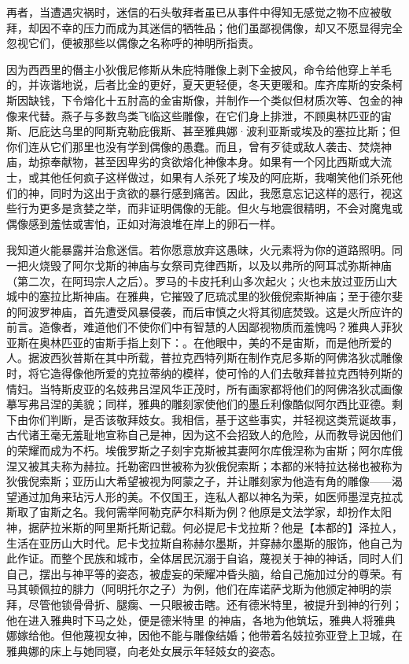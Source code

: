 再者，当遭遇灾祸时，迷信的石头敬拜者虽已从事件中得知无感觉之物不应被敬拜，却因不幸的压力而成为其迷信的牺牲品；他们虽鄙视偶像，却又不愿显得完全忽视它们，便被那些以偶像之名称呼的神明所指责。\par

因为西西里的僭主小狄俄尼修斯从朱庇特雕像上剥下金披风，命令给他穿上羊毛的，并诙谐地说，后者比金的更好，夏天更轻便，冬天更暖和。库齐库斯的安条柯斯因缺钱，下令熔化十五肘高的金宙斯像，并制作一个类似但材质次等、包金的神像来代替。燕子与多数鸟类飞临这些雕像，在它们身上排泄，不顾奥林匹亚的宙斯、厄庇达乌里的阿斯克勒庇俄斯、甚至雅典娜·波利亚斯或埃及的塞拉比斯；但你们连从它们那里也没有学到偶像的愚蠢。而且，曾有歹徒或敌人袭击、焚烧神庙，劫掠奉献物，甚至因卑劣的贪欲熔化神像本身。如果有一个冈比西斯或大流士，或其他任何疯子这样做过，如果有人杀死了埃及的阿庇斯，我嘲笑他们杀死他们的神，同时为这出于贪欲的暴行感到痛苦。因此，我愿意忘记这样的恶行，视这些行为更多是贪婪之举，而非证明偶像的无能。但火与地震很精明，不会对魔鬼或偶像感到羞怯或害怕，正如对海浪堆在岸上的卵石一样。\par

我知道火能暴露并治愈迷信。若你愿意放弃这愚昧，火元素将为你的道路照明。同一把火烧毁了阿尔戈斯的神庙与女祭司克律西斯，以及以弗所的阿耳忒弥斯神庙（第二次，在阿玛宗人之后）。罗马的卡皮托利山多次起火；火也未放过亚历山大城中的塞拉比斯神庙。在雅典，它摧毁了厄琉忒里的狄俄倪索斯神庙；至于德尔斐的阿波罗神庙，首先遭受风暴侵袭，而后审慎之火将其彻底焚毁。这是火所应许的前言。造像者，难道他们不使你们中有智慧的人因鄙视物质而羞愧吗？雅典人菲狄亚斯在奥林匹亚的宙斯手指上刻下：。在他眼中，美的不是宙斯，而是他所爱的人。据波西狄普斯在其中所载，普拉克西特列斯在制作克尼多斯的阿佛洛狄忒雕像时，将它造得像他所爱的克拉蒂纳的模样，使可怜的人们去敬拜普拉克西特列斯的情妇。当特斯皮亚的名妓弗吕涅风华正茂时，所有画家都将他们的阿佛洛狄忒画像摹写弗吕涅的美貌；同样，雅典的雕刻家使他们的墨丘利像酷似阿尔西比亚德。剩下由你们判断，是否该敬拜妓女。我相信，基于这些事实，并轻视这类荒诞故事，古代诸王毫无羞耻地宣称自己是神，因为这不会招致人的危险，从而教导说因他们的荣耀而成为不朽。埃俄罗斯之子刻宇克斯被其妻阿尔库俄涅称为宙斯；阿尔库俄涅又被其夫称为赫拉。托勒密四世被称为狄俄倪索斯；本都的米特拉达梯也被称为狄俄倪索斯；亚历山大希望被视为阿蒙之子，并让雕刻家为他造有角的雕像——渴望通过加角来玷污人形的美。不仅国王，连私人都以神名为荣，如医师墨涅克拉忒斯取了宙斯之名。我何需举阿勒克萨尔科斯为例？他原是文法学家，却扮作太阳神，据萨拉米斯的阿里斯托斯记载。何必提尼卡戈拉斯？他是【本都的】泽拉人，生活在亚历山大时代。尼卡戈拉斯自称赫尔墨斯，并穿赫尔墨斯的服饰，他自己为此作证。而整个民族和城市，全体居民沉溺于自谄，蔑视关于神的神话，同时人们自己，摆出与神平等的姿态，被虚妄的荣耀冲昏头脑，给自己施加过分的尊荣。有马其顿佩拉的腓力（阿明托尔之子）为例，他们在库诺萨戈斯为他颁定神明的崇拜，尽管他锁骨骨折、腿瘸、一只眼被击瞎。还有德米特里，被提升到神的行列；他在进入雅典时下马之处，便是德米特里 的神庙，各地为他筑坛，雅典人将雅典娜嫁给他。但他蔑视女神，因他不能与雕像结婚；他带着名妓拉弥亚登上卫城，在雅典娜的床上与她同寝，向老处女展示年轻妓女的姿态。\par

